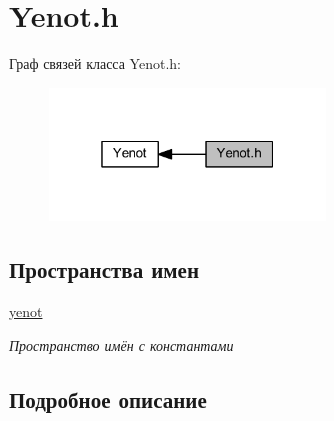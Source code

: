 \hypertarget{group__yenoth}{}\section{Yenot.\+h}
\label{group__yenoth}
Граф связей класса Yenot.\+h\+:
\nopagebreak
\begin{figure}[H]
\begin{center}
\leavevmode
\includegraphics[width=208pt]{group__yenoth}
\end{center}
\end{figure}
\subsection*{Пространства имен}
\begin{DoxyCompactItemize}
\item 
 \mbox{\hyperlink{namespaceyenot}{yenot}}
\begin{DoxyCompactList}\small\item\em Пространство имён с константами \end{DoxyCompactList}\end{DoxyCompactItemize}


\subsection{Подробное описание}
